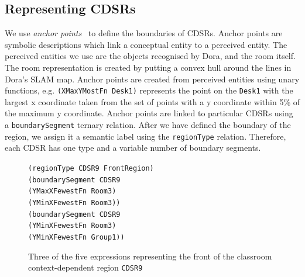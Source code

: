 \documentclass[letterpaper]{article}
\newcommand{\fw}[1]{\texttt{#1}}
\begin{document}
\subsection{Representing CDSRs}

We use \textit{anchor points}~\cite{Klenk/etal2011} to define the boundaries of CDSRs. Anchor points are symbolic descriptions which link a conceptual entity to a perceived entity. The perceived entities we use are the objects recognised by Dora, and the room itself. The room representation is created by putting a convex hull around the lines in Dora's SLAM map. Anchor points are created from perceived entities using unary functions, e.g. \fw{(XMaxYMostFn Desk1)} represents the point on the \fw{Desk1} with the largest x coordinate taken from the set of points with a y coordinate within 5\% of the maximum y coordinate. Anchor points are linked to particular CDSRs using a \fw{boundarySegment} ternary relation. After we have defined the boundary of the region, we assign it a semantic label using the \fw{regionType} relation. Therefore, each CDSR has one type and a variable number of boundary segments.

\begin{figure}[h]
	{\fontsize{8}{8} %

\fw{(regionType CDSR9 FrontRegion) \\
(boundarySegment CDSR9 \\
\hspace*{2em}(YMaxXFewestFn Room3) \\
\hspace*{2em}(YMinXFewestFn Room3)) \\
(boundarySegment CDSR9 \\
\hspace*{2em}(YMinXFewestFn Room3) \\
\hspace*{2em}(YMinXFewestFn Group1))
}
}
  \caption{Three of the five expressions representing the front of the classroom context-dependent region \fw{CDSR9}}
  \label{fig:cdsr-reps}
\end{figure}
\end{document}

